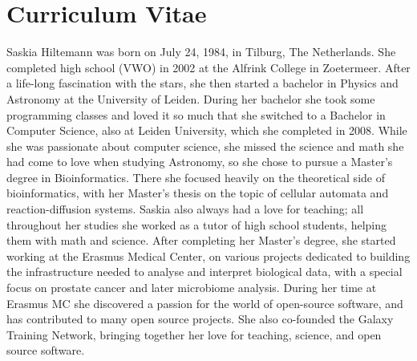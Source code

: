 \chapter{Curriculum Vitae}
\label{AppendixB}

Saskia Hiltemann was born on July 24, 1984, in Tilburg, The Netherlands. She completed high school (VWO) in 2002 at the Alfrink College in Zoetermeer. After a life-long fascination with the stars, she then started a bachelor in Physics and Astronomy at the University of Leiden. During her bachelor she took some programming classes and loved it so much that she switched to a Bachelor in Computer Science, also at Leiden University, which she completed in 2008. While she was passionate about computer science, she missed the science and math she had come to love when studying Astronomy, so she chose to pursue a Master's degree in Bioinformatics. There she focused heavily on the theoretical side of bioinformatics, with her Master's thesis on the topic of cellular automata and reaction-diffusion systems. Saskia also always had a love for teaching; all throughout her studies she worked as a tutor of high school students, helping them with math and science. After completing her Master's degree, she started working at the Erasmus Medical Center, on various projects dedicated to building the infrastructure needed to analyse and interpret biological data, with a special focus on prostate cancer and later microbiome analysis. During her time at Erasmus MC she discovered a passion for the world of open-source software, and has contributed to many open source projects. She also co-founded the Galaxy Training Network, bringing together her love for teaching, science, and open source software.

